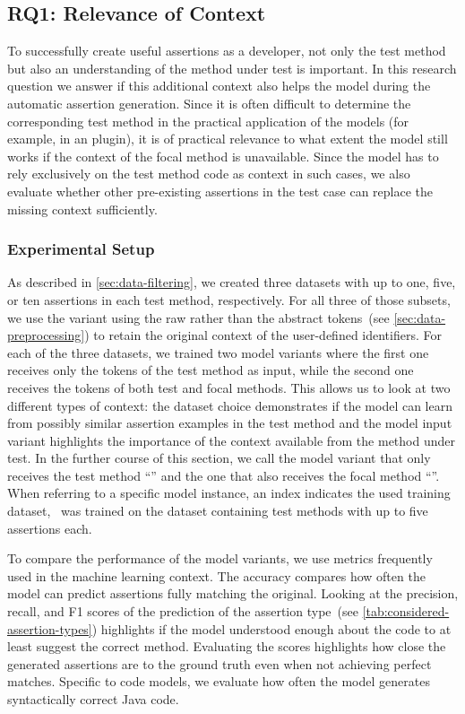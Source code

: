 
\subsection{RQ1: Relevance of Context}\label{sec:rq-context}

To successfully create useful assertions as a developer, not only the
test method but also an understanding of the method under test is
important. In this research question we answer if this additional
context also helps the \assertfive model during the automatic
assertion generation.
Since it is often difficult to determine the corresponding test method
in the practical application of the models (for example, in an \ide
plugin), it is of practical relevance to what extent the model still
works if the context of the focal method is unavailable.
Since the model has to rely exclusively on the test method code as
context in such cases, we also evaluate whether other pre-existing
assertions in the test case can replace the missing context
sufficiently.


\subsubsection{Experimental Setup}\label{sec:rq-context-setup}

As described in \cref{sec:data-filtering}, we created three datasets
with up to one, five, or ten assertions in each test method,
respectively.
For all three of those subsets, we use the variant using the raw
rather than the abstract tokens~(see \cref{sec:data-preprocessing}) to
retain the original context of the user-defined identifiers.
For each of the three datasets, we trained two model variants where
the first one receives only the tokens of the test method as input,
while the second one receives the tokens of both test and focal
methods.
This allows us to look at two different types of context: the dataset
choice demonstrates if the model can learn from possibly similar
assertion examples in the test method and the model input variant
highlights the importance of the context available from the method
under test.
In the further course of this section, we call the model variant that
only receives the test method \enquote{\temet{}} and the one that also
receives the focal method \enquote{\fomet{}}. When referring to a
specific model instance, an index indicates the used training dataset,
\eg~\temet[5] was trained on the dataset containing test methods with
up to five assertions each.

To compare the performance of the model variants, we use metrics
frequently used in the machine learning context.
The  accuracy compares how often the model can predict
assertions fully matching the original. Looking at the precision,
recall, and F1 scores of the prediction of the assertion type~(see
\cref{tab:considered-assertion-types}) highlights if the model
understood enough about the code to at least suggest the correct
method.
Evaluating the \bleu scores highlights how close the generated
assertions are to the ground truth even when not achieving perfect
matches.
Specific to code models, we evaluate how often the model generates
syntactically correct Java code.



